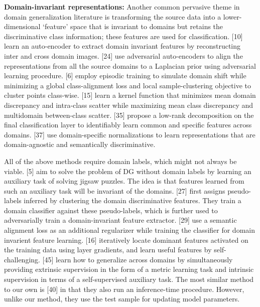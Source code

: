 \documentclass[review]{cvpr}
\begin{document}
\noindent\textbf{Domain-invariant representations:} 
 Another common pervasive theme in domain generalization literature is transforming the source data into a lower-dimensional ‘feature’
space that is invariant to domains but retains the discriminative class information; these features are used for classification. [10] learn an auto-encoder to extract domain invariant features by reconstructing inter and cross domain images. [24] use adversarial auto-encoders to align the representations from all the source domains to a Laplacian prior
using adversarial learning procedure. [6] employ episodic
training to simulate domain shift while minimizing a global
class-alignment loss and local sample-clustering objective
to cluster points class-wise. [15] learn a kernel function
that minimizes mean domain discrepancy and intra-class
scatter while maximizing mean class discrepancy and multidomain between-class scatter. [35] propose a low-rank decomposition on the final classification layer to identifiably learn common and specific features across domains. [37]
use domain-specific normalizations to learn representations
that are domain-agnostic and semantically discriminative.\par
All of the above methods require domain labels, which
might not always be viable. [5] aim to solve the problem of
DG without domain labels by learning an auxiliary task of
solving jigsaw puzzles. The idea is that features learned
from such an auxiliary task will be invariant of the domains. [27] first assigns pseudo-labels inferred by clustering the domain discriminative features. They train a domain
classifier against these pseudo-labels, which is further used
to adversarially train a domain-invariant feature extractor.
[29] use a semantic alignment loss as an additional regularizer while training the classifier for domain invarient feature
learning. [16] iteratively locate dominant features activated
on the training data using layer gradients, and learn useful
features by self-challenging. [45] learn how to generalize
across domains by simultaneously providing extrinsic supervision in the form of a metric learning task and intrinsic
supervision in terms of a self-supervised auxiliary task. The
most similar method to our own is [40] in that they also run
an inference-time procedure. However, unlike our method,
they use the test sample for updating model parameters.
\end{document}
